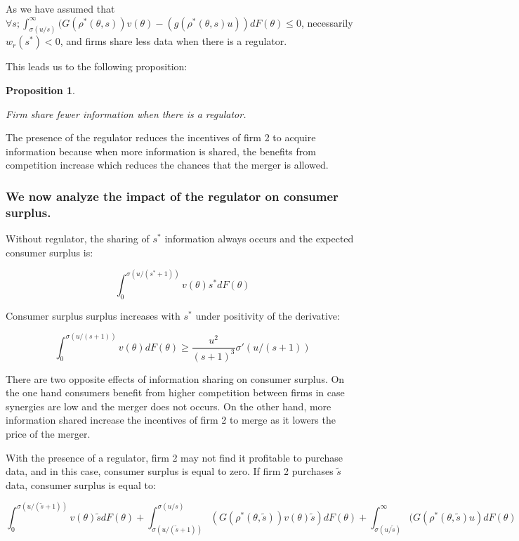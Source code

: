 \documentclass[a4paper,leqno]{article}%
\newtheorem{prop}{Proposition}
\renewcommand{\t}{\theta}
\newcommand{\s}{\sigma}
\begin{document}
As we have assumed that $\forall s; \int_{\s(u/s)}^\infty (G(\rho^*(\t,s))v(\t)-(g(\rho^*(\t,s)u))dF(\t)\leq 0$, necessarily $w_r(s^*)< 0$, and firms share less data when there is a regulator.

\medskip 

This leads us to the following proposition:

\begin{prop}~~\label{prop:2}

Firm share fewer information when there is a regulator.

\end{prop}

The presence of the regulator reduces the incentives of firm 2 to acquire information because when more information is shared, the benefits from competition increase which reduces the chances that the merger is allowed.

\medskip 

\subsubsection{We now analyze the impact of the regulator on consumer surplus.}

Without regulator, the sharing of $s^*$ information always occurs and the expected consumer surplus is:

\[
\int_{0}^{\s(u/(s^*+1))}v(\t)s^* dF(\t)
\]

Consumer surplus surplus increases with $s^*$ under positivity of the derivative:

\[
\int_{0}^{\s(u/(s+1))}v(\t) dF(\t)\geq \frac{u^2}{(s+1)^3}\s'(u/(s+1))
\]

There are two opposite effects of information sharing on consumer surplus. On the one hand consumers benefit from higher competition between firms in case synergies are low and the merger does not occurs. On the other hand, more information shared increase the incentives of firm 2 to merge as it lowers the price of the merger.

\medskip

With the presence of a regulator, firm 2 may not find it profitable to purchase data, and in this case, consumer surplus is equal to zero. If firm 2 purchases $\tilde s$ data, consumer surplus is equal to:

\[
\int_{0}^{\s(u/(\tilde s+1))}v(\t)\tilde s dF(\t)+\int_{\s(u/(\tilde s+1))}^{\s(u/s)}(G(\rho^*(\t,\tilde s))v(\t)\tilde s)dF(\t)+\int_{\s(u/\tilde s)}^\infty (G(\rho^*(\t,\tilde s)u)dF(\t)
\]
\end{document}
